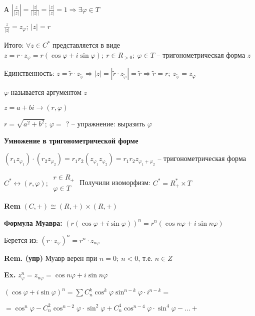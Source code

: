 \documentclass[14pt, letter paper]{article}
\begin{document}
А $|\frac{z}{|z|}| = \frac{|z|}{||z||} = \frac{|z|}{|z|} = 1 \Rightarrow \exists \varphi \in T$

$\frac{z}{|z|} = z_\varphi;\ |z| = r$

Итого: $\forall z \in C^*$ представляется в виде $z = r \cdot z_\varphi = r(\cos\varphi + i\sin\varphi);\ r \in R_{> 0};\ \varphi \in T$ -- тригонометрическая форма $z$

Единственность: $z = \tilde{r} \cdot z_{\tilde{\varphi}} \Rightarrow |z| = |\tilde{r} \cdot z_{\tilde{\varphi}}| = \tilde{r} \Rightarrow \tilde{r} = r;\ z_{\tilde{\varphi}} = z_{\varphi}$

\vspace{2mm}

$\varphi$ называется аргументом $z$

$z = a + bi \rightarrow (r, \varphi)$

$r = \sqrt{a^2 + b^2};\ \varphi =$ ? -- упражнение: выразить $\varphi$

\vspace{5mm}

\textbf{Умножение в тригонометрической форме}

$(r_1 z_{\varphi_1}) \cdot (r_2 z_{\varphi_2}) = r_1r_2(z_{\varphi_1}z_{\varphi_2}) = r_1r_2z_{\varphi_1 + \varphi_2}$ -- тригонометрическая форма

$C^* \leftrightarrow (r, \varphi);\ \begin{gathered}
    r \in R_+ \\
    \varphi \in T
\end{gathered}$ Получили изоморфизм: $C^* = R^*_+ \times T$

\textbf{Rem} $(C, +) \cong (R, +) \times (R, +)$

\vspace{5mm}

\textbf{Формула Муавра:} $(r(\cos\varphi + i\sin\varphi))^n = r^n(\cos n\varphi + i\sin n\varphi)$

Берется из: $(r \cdot z_{\varphi})^n = r^n \cdot z_{n\varphi}$

\vspace{3mm}

\textbf{Rem. (упр)} Муавр верен при $n = 0;\ n < 0$, т.е. $n \in Z$

\textbf{Ex.} $z_\varphi^n = z_{n\varphi} = \cos n\varphi + i\sin n\varphi$

$(\cos\varphi + i\sin\varphi)^n = \sum C_n^k \cos^k\varphi \sin^{n-k}\varphi \cdot i^{n - k}=$

$= \cos^n \varphi - C_n^2 \cos^{n - 2} \varphi \cdot \sin^2 \varphi + C_n^4 \cos^{n - 4} \varphi \cdot \sin^4 \varphi - \ldots +$
\end{document}
